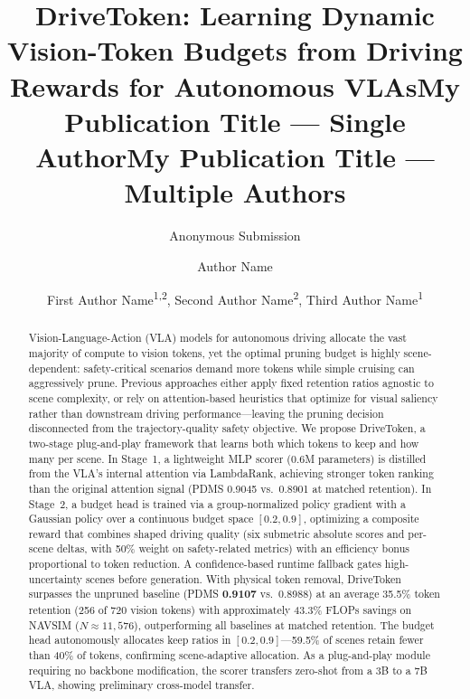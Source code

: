 \documentclass[letterpaper]{article} %
\title{DriveToken: Learning Dynamic Vision-Token Budgets from Driving Rewards for Autonomous VLAs}
\author{
    Anonymous Submission
}
\title{My Publication Title --- Single Author}
\author {
    Author Name
}
\title{My Publication Title --- Multiple Authors}
\author {
    First Author Name\textsuperscript{\rm 1,\rm 2}\equalcontrib,
    Second Author Name\textsuperscript{\rm 2}\equalcontrib,
    Third Author Name\textsuperscript{\rm 1}\corresponding
}
\begin{document}
\maketitle

\begin{abstract}
Vision-Language-Action (VLA) models for autonomous driving allocate the vast majority of compute to vision tokens, yet the optimal pruning budget is highly scene-dependent: safety-critical scenarios demand more tokens while simple cruising can aggressively prune. Previous approaches either apply fixed retention ratios agnostic to scene complexity, or rely on attention-based heuristics that optimize for visual saliency rather than downstream driving performance---leaving the pruning decision disconnected from the trajectory-quality safety objective. We propose DriveToken, a two-stage plug-and-play framework that learns both which tokens to keep and how many per scene. In Stage~1, a lightweight MLP scorer (0.6M parameters) is distilled from the VLA's internal attention via LambdaRank, achieving stronger token ranking than the original attention signal (PDMS 0.9045 vs.\ 0.8901 at matched retention). In Stage~2, a budget head is trained via a group-normalized policy gradient with a Gaussian policy over a continuous budget space $[0.2, 0.9]$, optimizing a composite reward that combines shaped driving quality (six submetric absolute scores and per-scene deltas, with 50\% weight on safety-related metrics) with an efficiency bonus proportional to token reduction. A confidence-based runtime fallback gates high-uncertainty scenes before generation. With physical token removal, DriveToken surpasses the unpruned baseline (PDMS \textbf{0.9107} vs.\ 0.8988) at an average 35.5\% token retention (256 of 720 vision tokens) with approximately 43.3\% FLOPs savings on NAVSIM ($N \approx 11{,}576$), outperforming all baselines at matched retention. The budget head autonomously allocates keep ratios in $[0.2, 0.9]$---59.5\% of scenes retain fewer than 40\% of tokens, confirming scene-adaptive allocation. As a plug-and-play module requiring no backbone modification, the scorer transfers zero-shot from a 3B to a 7B VLA, showing preliminary cross-model transfer.
\end{abstract}


\newcommand{\ours}{DriveToken}
\end{document}

